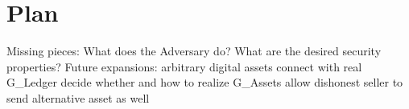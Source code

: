 \section{Plan}
 Missing pieces:
   What does the Adversary do?
   What are the desired security properties?
 Future expansions:
   arbitrary digital assets
   connect with real G\_Ledger
   decide whether and how to realize G\_Assets
   allow dishonest seller to send alternative asset as well
